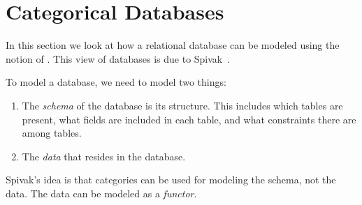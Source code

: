 
\section{Categorical Databases}
\label{sec:functors-categorical-db}

In this section we look at how a relational database can be modeled using the notion of .
This view of databases is due to Spivak~\cite{spivak2019categorical,spivak2012ologs,}.

To model a database, we need to model two things:
\begin{enumerate}
    \item The \emph{schema} of the database is its structure.
          This includes which tables are present,
          what fields are included in each table, and what constraints there are among tables.
    \item The \emph{data} that resides in the database.
\end{enumerate}

Spivak's idea is that categories can be used for modeling the schema, not the data.
The data can be modeled as a \emph{functor}.

